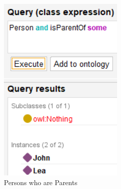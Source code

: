 \begin{figure}[H]
\begin{minipage}[b]{0.25\textwidth}
        \includegraphics[width=\textwidth]{images/1.1 - tuto/q2.png}
        \caption{Persons who are Parents}
        \label{fig:image2}
    \end{minipage}
    \hfill
    \begin{minipage}[b]{0.25\textwidth}
        \centering

\end{minipage}
\end{figure}
